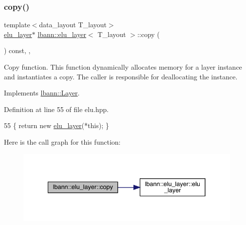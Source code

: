 \subsubsection{\texorpdfstring{copy()}{copy()}}
{\footnotesize\ttfamily template$<$data\+\_\+layout T\+\_\+layout$>$ \\
\hyperlink{classlbann_1_1elu__layer}{elu\+\_\+layer}$\ast$ \hyperlink{classlbann_1_1elu__layer}{lbann\+::elu\+\_\+layer}$<$ T\+\_\+layout $>$\+::copy (\begin{DoxyParamCaption}{ }\end{DoxyParamCaption}) const\hspace{0.3cm}{\ttfamily [inline]}, {\ttfamily [override]}, {\ttfamily [virtual]}}

Copy function. This function dynamically allocates memory for a layer instance and instantiates a copy. The caller is responsible for deallocating the instance. 

Implements \hyperlink{classlbann_1_1Layer_af420f22bbac801c85483ade84588a23f}{lbann\+::\+Layer}.



Definition at line 55 of file elu.\+hpp.


\begin{DoxyCode}
55 \{ \textcolor{keywordflow}{return} \textcolor{keyword}{new} \hyperlink{classlbann_1_1elu__layer_a37a371015add326278f7a537ade73e30}{elu\_layer}(*\textcolor{keyword}{this}); \}
\end{DoxyCode}
Here is the call graph for this function\+:\nopagebreak
\begin{figure}[H]
\begin{center}
\leavevmode
\includegraphics[width=335pt]{classlbann_1_1elu__layer_adc65c53cdd440f516f6018894a9befde_cgraph}
\end{center}
\end{figure}
\mbox{\label{classlbann_1_1elu__layer_a50f1158f8a6a5b358a311dabd4562948}} 
